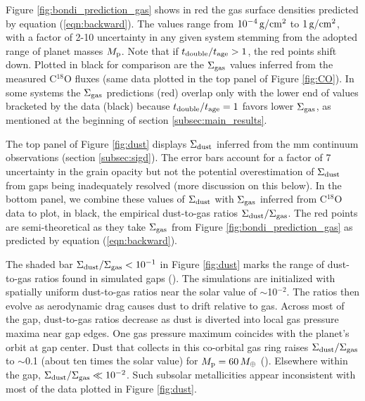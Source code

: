 \documentclass[fleqn,usenatbib]{mnras}
\newcommand{\Sigg}{\Sigma_{\rm gas}}
\newcommand{\Sigd}{\Sigma_{\rm dust}}
\newcommand{\gcm}{\rm g/cm^2}
\begin{document}
Figure \ref{fig:bondi_prediction_gas} shows in red the gas surface densities predicted by equation (\ref{eqn:backward}). The values range from $10^{-4}\,\gcm$ to $1\,\gcm$, with a factor of 2-10 uncertainty in any given system stemming from the adopted range of planet masses $M_{\rm p}$. Note that if $t_{\rm double}/t_{\rm age} > 1$, the red points shift down. Plotted in black for comparison are the $\Sigg$ values inferred from the measured C$^{18}$O fluxes (same data plotted in the top panel of Figure \ref{fig:CO}). In some systems the $\Sigg$ predictions (red) overlap only with the lower end of values bracketed by the data (black) because $t_{\rm double}/t_{\rm age} = 1$ favors lower $\Sigg$, as mentioned at the beginning of section \ref{subsec:main_results}.
 


The top panel of Figure \ref{fig:dust} displays $\Sigd$ inferred
from the mm continuum observations (section \ref{subsec:sigd}). The
error bars account for a factor of 7 uncertainty in the grain opacity
but not the potential overestimation of $\Sigd$ from gaps being inadequately resolved (more discussion on this below). In the bottom panel, we combine these values of $\Sigd$ with $\Sigg$ 
inferred from C$^{18}$O data to plot, in black, the empirical
dust-to-gas ratios $\Sigd/\Sigg$. The red points are semi-theoretical as
they take $\Sigg$ from
Figure \ref{fig:bondi_prediction_gas} as predicted by equation
(\ref{eqn:backward}).


The shaded bar $\Sigd/\Sigg < 10^{-1}$ in Figure \ref{fig:dust} marks the range of dust-to-gas ratios found in simulated
gaps (\citealt{dong_etal_2017}). The simulations are initialized with spatially uniform
dust-to-gas ratios near the solar value of $\sim$10$^{-2}$. The ratios then evolve as aerodynamic drag causes dust to drift relative to gas.
Across most of the gap, dust-to-gas ratios decrease as dust is diverted
into local gas pressure maxima near gap edges. One gas pressure maximum coincides with the planet's orbit at gap center. Dust that collects in this co-orbital gas ring raises $\Sigd/\Sigg$ to
$\sim$0.1 (about ten times the solar value) for $M_{\rm p} = 60\,
M_\oplus$ (\citealt{dong_etal_2017}). Elsewhere within the gap,
$\Sigd/\Sigg \ll 10^{-2}$. Such subsolar metallicities appear inconsistent with most of the data plotted in Figure \ref{fig:dust}. 
\end{document}
